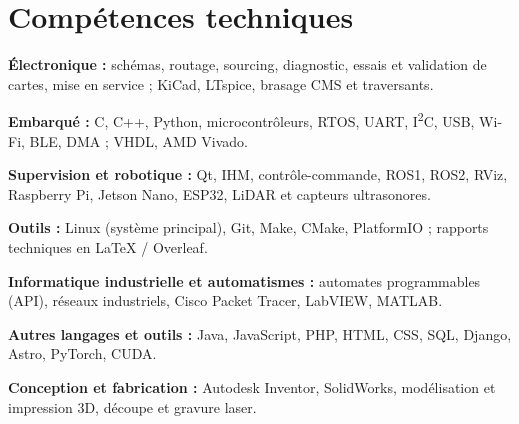 \documentclass[10pt,a4paper]{article}
\begin{document}
\vspace{0.6cm}


\section{Compétences techniques}
\vspace{0.2cm}

\textbf{Électronique :}
schémas, routage, sourcing, diagnostic, essais et validation
de cartes, mise en service ; KiCad, LTspice, brasage CMS
et traversants.\par

\vspace{0.2cm}

\textbf{Embarqué :}
C, C++, Python, microcontrôleurs, RTOS, UART,
I\textsuperscript{2}C, USB, Wi-Fi, BLE, DMA ;
VHDL, AMD Vivado.\par

\vspace{0.2cm}

\textbf{Supervision et robotique :}
Qt, IHM, contrôle-commande, ROS1, ROS2, RViz, Raspberry Pi,
Jetson Nano, ESP32, LiDAR et capteurs ultrasonores.\par

\vspace{0.2cm}

\textbf{Outils :}
Linux (système principal), Git, Make, CMake, PlatformIO ;
rapports techniques en LaTeX / Overleaf.\par

\vspace{0.2cm}

\textbf{Informatique industrielle et automatismes :}
automates programmables (API), réseaux industriels,
Cisco Packet Tracer, LabVIEW, MATLAB.\par

\vspace{0.2cm}

\textbf{Autres langages et outils :}
Java, JavaScript, PHP, HTML, CSS, SQL, Django, Astro,
PyTorch, CUDA.\par

\vspace{0.2cm}

\textbf{Conception et fabrication :}
Autodesk Inventor, SolidWorks, modélisation et impression 3D,
découpe et gravure laser.
\end{document}
